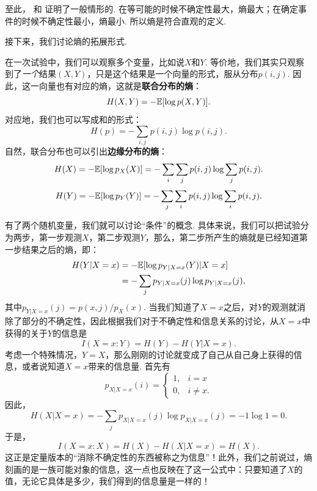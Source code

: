 至此， 和 证明了一般情形的. 在等可能的时候不确定性最大，熵最大；在确定事件的时候不确定性最小，熵最小. 所以熵是符合直观的定义. 

接下来，我们讨论熵的拓展形式.

在一次试验中，我们可以观察多个变量，比如说$X$和$Y$. 等价地，我们其实只观察到了\textit{一个}结果$(X,Y)$，只是这个结果是一个向量的形式，服从分布$p(i,j)$. 因此，这一向量也有对应的熵，这就是\textbf{联合分布的熵}：
    \[H(X,Y)=-\mathbb{E}[\log p(X,Y)].\]
对应地，我们也可以写成和的形式：
    \[H(p)=-\sum_{i,j}p(i,j)\log p(i,j).\]
自然，联合分布也可以引出\textbf{边缘分布的熵}：
\[H(X)=-\mathbb{E}[\log p_X(X)]=-\sum_i \sum_j p(i,j)\log \sum_j p(i,j).\]
\[H(Y)=-\mathbb{E}[\log p_Y(Y)]=-\sum_j \sum_i p(i,j)\log \sum_i p(i,j).\]

有了两个随机变量，我们就可以讨论“条件”的概念. 具体来说，我们可以把试验分为两步，第一步观测$X$，第二步观测$Y$，那么，第二步所产生的熵就是已经知道第一步结果之后的熵，即：
\begin{align*}
    H(Y| X=x)&=-\mathbb{E}[\log p_{Y| X=x}(Y)| X=x]\\
    &=-\sum_{j}p_{Y|X=x}(j)\log p_{Y|X=x}(j),
\end{align*}
其中$p_{Y|X=x}(j)=p(x,j)/p_X(x)$. 当我们知道了$X=x$之后，对$Y$的观测就消除了部分的不确定性，因此根据我们对于不确定性和信息关系的讨论，从$X=x$中获得的关于$Y$的信息是
\[I(X=x:Y)=H(Y)-H(Y|X=x).\]
考虑一个特殊情况，$Y=X$，那么刚刚的讨论就变成了自己从自己身上获得的信息，或者说知道$X=x$带来的信息量. 首先有
\[p_{X|X=x}(i)=\begin{cases}
    1,&i=x\\
    0,&i\ne x.
\end{cases}\]
因此，
\[H(X| X=x)=-\sum_{j}p_{X|X=x}(j)\log p_{X|X=x}(j)=-1\log 1=0.\]
于是，
\[I(X=x:X)=H(X)-H(X|X=x)=H(X).\]
这正是定量版本的“消除不确定性的东西被称之为信息”！此外，我们之前说过，熵刻画的是一族可能对象的信息，这一点也反映在了这一公式中：只要知道了$X$的值，无论它具体是多少，我们得到的信息量是一样的！

